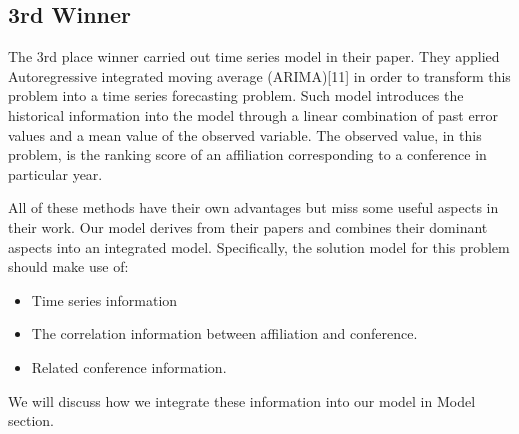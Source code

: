 \documentclass[letterpaper]{article}
\begin{document}
\subsection{3rd Winner}
The 3rd place winner carried out time series model in their paper. They applied Autoregressive integrated moving average (ARIMA)[11] in order to transform this problem into a time series forecasting problem. Such model introduces the historical information into the model through a linear combination of past error values and a mean value of the observed variable. The observed value, in this problem, is the ranking score of an affiliation corresponding to a conference in particular year. 

All of these methods have their own advantages but miss some useful aspects in their work. Our model derives from their papers and combines their dominant aspects into an integrated model. Specifically, the solution model for this problem should make use of:
\begin{itemize}
    \item Time series information
    \item The correlation information between affiliation and conference.
    \item Related conference information.
\end{itemize}
We will discuss how we integrate these information into our model in Model section.
\end{document}
